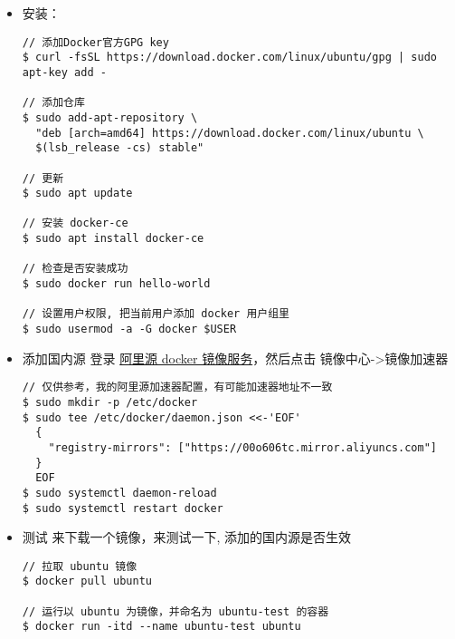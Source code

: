 \begin{itemize}
\item 安装：
\begin{lstlisting}
// 添加Docker官方GPG key
$ curl -fsSL https://download.docker.com/linux/ubuntu/gpg | sudo apt-key add -

// 添加仓库
$ sudo add-apt-repository \
  "deb [arch=amd64] https://download.docker.com/linux/ubuntu \
  $(lsb_release -cs) stable"

// 更新 
$ sudo apt update

// 安装 docker-ce 
$ sudo apt install docker-ce

// 检查是否安装成功 
$ sudo docker run hello-world

// 设置用户权限, 把当前用户添加 docker 用户组里
$ sudo usermod -a -G docker $USER

\end{lstlisting}

\item 添加国内源 
登录 \href{https://cr.console.aliyun.com/cn-hangzhou/instances/mirrors}{阿里源 docker 镜像服务}，然后点击 镜像中心->镜像加速器
\begin{lstlisting}
// 仅供参考，我的阿里源加速器配置，有可能加速器地址不一致
$ sudo mkdir -p /etc/docker
$ sudo tee /etc/docker/daemon.json <<-'EOF'
  {
    "registry-mirrors": ["https://00o606tc.mirror.aliyuncs.com"]
  }
  EOF
$ sudo systemctl daemon-reload
$ sudo systemctl restart docker
\end{lstlisting}

\item 测试
来下载一个镜像，来测试一下, 添加的国内源是否生效
\begin{lstlisting}
// 拉取 ubuntu 镜像
$ docker pull ubuntu

// 运行以 ubuntu 为镜像，并命名为 ubuntu-test 的容器 
$ docker run -itd --name ubuntu-test ubuntu
\end{lstlisting}
\end{itemize}
